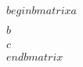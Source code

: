 \documentclass[preview]{standalone}
\begin{document}
\begin{align*}
\quad\\begin{bmatrix} a \quad\\\quad\\ b \quad\\\quad\\ c \quad\\end{bmatrix}
\end{align*}
\end{document}
